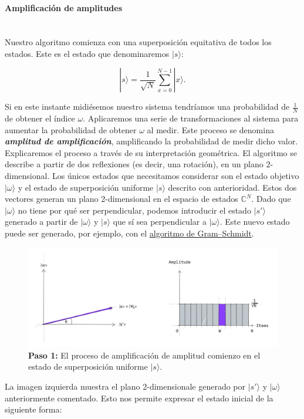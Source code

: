 \documentclass[11pt]{article}
\newcommand{\ra}{\rangle}
\newcommand{\myparagraph}[1]{\paragraph*{ \\ #1}\mbox{}\\}
\theoremstyle{plain}
\begin{document}
\myparagraph{Amplificación de amplitudes}

Nuestro algoritmo comienza con una superposición equitativa de todos los estados. Este es el estado que denominaremos $|s\ra$:

\[
	|s\ra = \frac{1}{\sqrt N} \sum_{x = 0}^{N-1} |x\ra.
\]

Si en este instante midiésemos nuestro sistema tendríamos una probabilidad de $\frac{1}{N}$ de obtener el índice $\omega$. Aplicaremos una serie de transformaciones al sistema para aumentar la probabilidad de obtener $\omega$ al medir. Este proceso se denomina \emph{\textbf{amplitud de amplificación}}, amplificando la probabilidad de medir dicho valor. \\

Explicaremos el proceso a través de su interpretación geométrica. El algoritmo se describe a partir de dos reflexiones (es decir, una rotación), en un plano 2-dimensional. Los únicos estados que necesitamos considerar son el estado objetivo $|\omega\ra$ y el estado de superposición uniforme $|s\ra$ descrito con anterioridad. Estos dos vectores generan un plano 2-dimensional en el espacio de estados $\mathbb{C}^{N}$. Dado que $|\omega\ra$ no tiene por qué ser perpendicular, podemos introducir el estado $|s'\ra$ generado a partir de $|\omega\ra$ y $|s\ra$ que sí sea perpendicular a $|\omega\ra$. Este nuevo estado puede ser generado, por ejemplo, con el  \href{https://en.wikipedia.org/wiki/Gram%E2%80%93Schmidt_process}{algoritmo de Gram–Schmidt}.

\begin{figure}[H]
	\centering
	\includegraphics[scale=0.5]{figures/grover_step1}
	\caption{\textbf{Paso 1:} El proceso de amplificación de amplitud comienzo en el estado de superposición uniforme $|s\ra$.}
\end{figure}


La imagen izquierda muestra el plano 2-dimensionale generado por $|s'\ra$ y $|\omega\ra$ anteriormente comentado. Esto nos permite expresar el estado inicial de la siguiente forma:
\end{document}

